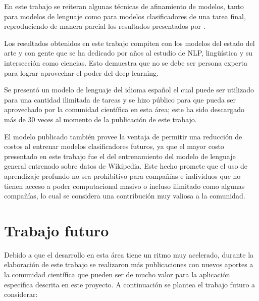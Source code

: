 En este trabajo se reiteran algunas técnicas de afinamiento de modelos, tanto para modelos de lenguaje como para modelos clasificadores de una tarea final, reproduciendo de manera parcial los resultados presentados por \citeauthor{howard2018}.

Los resultados obtenidos en este trabajo compiten con los modelos del estado del arte y con gente que se ha dedicado por años al estudio de NLP, lingüística y su intersección como ciencias. Esto demuestra que no se debe ser persona experta para lograr aprovechar el poder del deep learning.

Se presentó un modelo de lenguaje del idioma español el cual puede ser utilizado para una cantidad ilimitada de tareas y se hizo público para que pueda ser aprovechado por la comunidad científica en esta área; este ha sido descargado más de 30 veces al momento de la publicación de este trabajo.

El modelo publicado también provee la ventaja de permitir una reducción de costos al entrenar modelos clasificadores futuros, ya que el mayor costo presentado en este trabajo fue el del entrenamiento del modelo de lenguaje general entrenado sobre datos de Wikipedia. Este hecho promete que el uso de aprendizaje profundo no sea prohibitivo para compañías e individuos que no tienen acceso a poder computacional masivo o incluso ilimitado como algunas compañías, lo cual se considera una contribución muy valiosa a la comunidad.

\section{Trabajo futuro}

Debido a que el desarrollo en esta área tiene un ritmo muy acelerado, durante la elaboración de este trabajo se realizaron más publicaciones con nuevos aportes a la comunidad científica que pueden ser de mucho valor para la aplicación específica descrita en este proyecto. A continuación se plantea el trabajo futuro a considerar:

